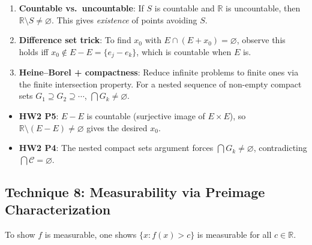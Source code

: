 \documentclass[11pt]{report}
\begin{document}
\begin{rembox}[Strategy]
\begin{enumerate}[label=(\roman*)]
\item \textbf{Countable vs.\ uncountable}: If $S$ is countable and $\mathbb{R}$ is uncountable, then $\mathbb{R} \setminus S \neq \varnothing$. This gives \textit{existence} of points avoiding $S$.
\item \textbf{Difference set trick}: To find $x_0$ with $E \cap (E + x_0) = \varnothing$, observe this holds iff $x_0 \notin E - E = \{e_j - e_k\}$, which is countable when $E$ is.
\item \textbf{Heine--Borel + compactness}: Reduce infinite problems to finite ones via the finite intersection property. For a nested sequence of non-empty compact sets $G_1 \supseteq G_2 \supseteq \cdots$, $\bigcap G_k \neq \varnothing$.
\end{enumerate}
\end{rembox}

\begin{exbox}
\begin{itemize}
\item \textbf{HW2 P5}: $E - E$ is countable (surjective image of $E \times E$), so $\mathbb{R} \setminus (E - E) \neq \varnothing$ gives the desired $x_0$.
\item \textbf{HW2 P4}: The nested compact sets argument forces $\bigcap G_k \neq \varnothing$, contradicting $\bigcap \mathcal{C} = \varnothing$.
\end{itemize}
\end{exbox}

\subsection{Technique 8: Measurability via Preimage Characterization}

To show $f$ is measurable, one shows $\{x : f(x) > c\}$ is measurable for all $c \in \mathbb{R}$.
\end{document}
